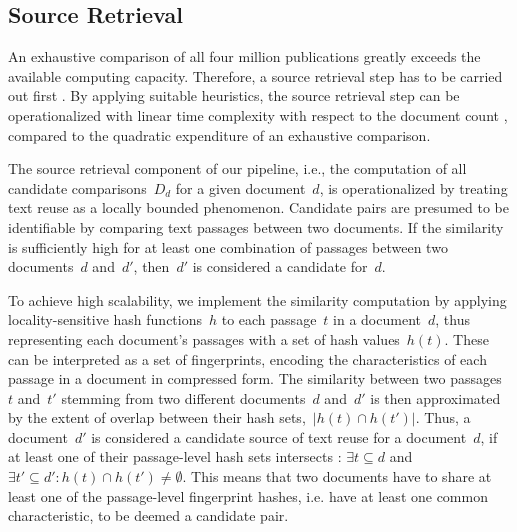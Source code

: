 \subsection*{Source Retrieval}

An exhaustive comparison of all four million publications greatly exceeds the available computing capacity. Therefore, a source retrieval step has to be carried out first \cite{hagen:2015e,hagen:2017e}. By applying suitable heuristics, the source retrieval step can be operationalized with linear time complexity with respect to the document count \cite{stein:2019c}, compared to the quadratic expenditure of an exhaustive comparison.

The source retrieval component of our pipeline, i.e., the computation of all candidate comparisons~$D_d$ for a given document~$d$, is operationalized by treating text reuse as a locally bounded phenomenon. Candidate pairs are presumed to be identifiable by comparing text passages between two documents. If the similarity is sufficiently high for at least one combination of passages between two documents~$d$ and~$d'$, then~$d'$ is considered a candidate for~$d$. 

To achieve high scalability, we implement the similarity computation by applying locality-sensitive hash functions~$h$ to each passage~$t$ in a document~$d$, thus representing each document's passages with a set of hash values~$h(t)$. These can be interpreted as a set of fingerprints, encoding the characteristics of each passage in a document in compressed form. The similarity between two passages~$t$ and~$t'$ stemming from two different documents~$d$ and~$d'$ is then approximated by the extent of overlap between their hash sets,~$|h(t)\cap h(t')|$. Thus, a document~$d'$ is considered a candidate source of text reuse for a document~$d$, if at least one of their passage-level hash sets intersects \cite{stein:2019c}: $\exists t \subseteq d$ and $\exists t' \subseteq d' : h(t) \cap h(t')\neq\emptyset$. This means that two documents have to share at least one of the passage-level fingerprint hashes, i.e. have at least one common characteristic, to be deemed a candidate pair.


